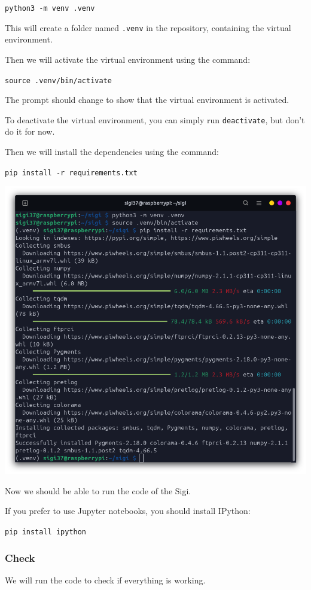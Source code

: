 \documentclass{article}
\begin{document}
\texttt{python3 -m venv .venv}

This will create a folder named \texttt{.venv} in the repository, containing the virtual
environment.

Then we will activate the virtual environment using the command:

\texttt{source .venv/bin/activate}

The prompt should change to show that the virtual environment is activated.

To deactivate the virtual environment, you can simply run \texttt{deactivate}, but don't do it
for now.

Then we will install the dependencies using the command:

\texttt{pip install -r requirements.txt}

\includegraphics[scale=0.37]{img/venv_activated.png}

Now we should be able to run the code of the Sigi.

If you prefer to use Jupyter notebooks, you should install IPython:

\texttt{pip install ipython}

\subsubsection{Check}

We will run the code to check if everything is working.
\end{document}
